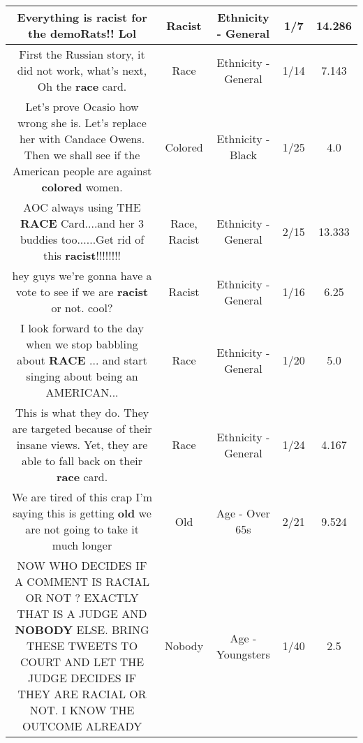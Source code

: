 \documentclass[11pt]{article}
\newlength\mylength
\begin{document}
\begin{center}
\begin{longtable}{|C{.65\mylength}|C{.30\mylength}|C{.12\mylength}|C{.12\mylength}|C{.12\mylength}|}
  \small Everything is \textbf{racist} for the demoRats!! Lol\normalsize   & Racist & Ethnicity - General & 1/7 & 14.286 \\  \hline
  \small First the Russian story, it did not work, what's next, Oh the \textbf{race} card.\normalsize   & Race & Ethnicity - General & 1/14 & 7.143 \\  \hline
  \small Let's prove Ocasio how wrong she is. Let's replace her with Candace Owens. Then we shall see if the American people are against \textbf{colored} women.\normalsize   & Colored & Ethnicity - Black & 1/25 & 4.0 \\  \hline
  \small AOC always using THE \textbf{RACE} Card....and her 3 buddies too......Get rid of this \textbf{racist}!!!!!!!!\normalsize   & Race, Racist & Ethnicity - General & 2/15 & 13.333 \\  \hline
  \small hey guys we're gonna have a vote to see if we are \textbf{racist} or not.   cool?\normalsize   & Racist & Ethnicity - General & 1/16 & 6.25 \\  \hline
  \small I look forward to the day when we stop babbling about \textbf{RACE} ... and start singing about being an AMERICAN...\normalsize   & Race & Ethnicity - General & 1/20 & 5.0 \\  \hline
  \small This is what they do. They are targeted because of their insane views. Yet, they are able to fall back on their \textbf{race} card.\normalsize   & Race & Ethnicity - General & 1/24 & 4.167 \\  \hline
  \small We are tired of this crap I'm saying this is getting \textbf{old} we are not going to take it much longer\normalsize   & Old & Age - Over 65s & 2/21 & 9.524 \\  \hline
  \small NOW WHO DECIDES IF A COMMENT IS RACIAL OR NOT ? EXACTLY THAT IS A JUDGE AND \textbf{NOBODY} ELSE. BRING THESE TWEETS TO COURT AND LET THE JUDGE DECIDES IF THEY ARE RACIAL OR NOT. I KNOW THE OUTCOME ALREADY\normalsize   & Nobody & Age - Youngsters & 1/40 & 2.5 \\  \hline

\end{longtable}
\end{center}
\end{document}
